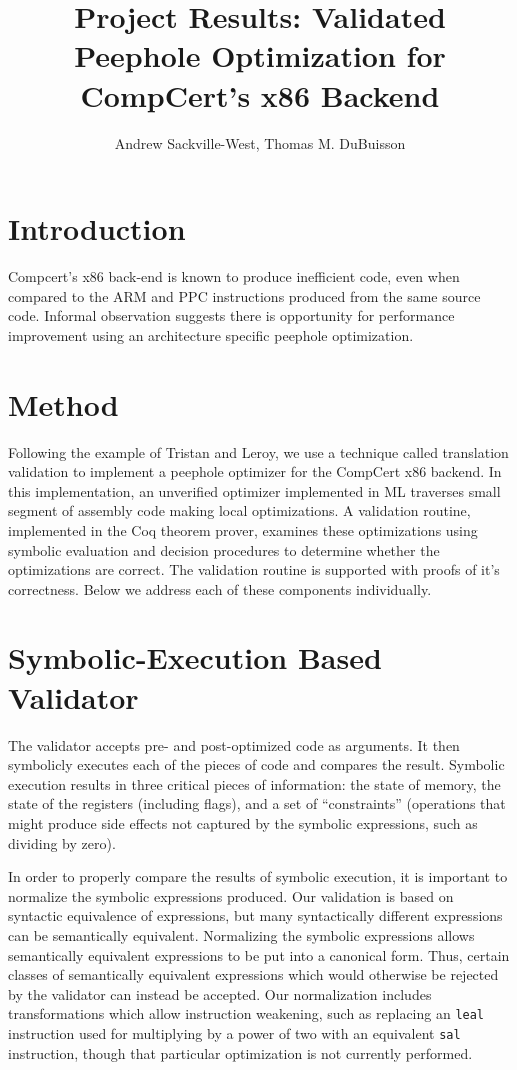 \documentclass{article}
\title{Project Results: Validated Peephole Optimization for CompCert's x86 Backend}
\author{Andrew Sackville-West, Thomas M. DuBuisson}
\begin{document}
\maketitle

\section{Introduction}

Compcert's x86 back-end is known to produce inefficient code, even
when compared to the ARM and PPC instructions produced from the same
source code.  Informal observation suggests there is opportunity for
performance improvement using an architecture specific peephole
optimization.

\section{Method}

Following the example of Tristan and Leroy, we use a technique called
translation validation to implement a peephole optimizer for the
CompCert x86 backend. In this implementation, an unverified optimizer
implemented in ML traverses small segment of assembly code making
local optimizations. A validation routine, implemented in the Coq
theorem prover, examines these optimizations using symbolic evaluation
and decision procedures to determine whether the optimizations are
correct. The validation routine is supported with proofs of it's
correctness.  Below we address each of these components individually.

\section{Symbolic-Execution Based Validator}

The validator accepts pre- and post-optimized code as arguments.
It then symbolicly executes each of the pieces of code and compares
the result.  Symbolic execution results in three critical pieces of
information: the state of memory, the state of the registers
(including flags), and a set of ``constraints'' (operations that might
produce side effects not captured by the symbolic expressions, such as
dividing by zero).

In order to properly compare the results of symbolic execution, it is
important to normalize the symbolic expressions produced. Our
validation is based on syntactic equivalence of expressions, but many
syntactically different expressions can be semantically
equivalent. Normalizing the symbolic expressions allows semantically
equivalent expressions to be put into a canonical form. Thus, certain
classes of semantically equivalent expressions which would otherwise
be rejected by the validator can instead be accepted. Our
normalization includes transformations which allow instruction
weakening, such as replacing an {\tt leal} instruction used for
multiplying by a power of two with an equivalent {\tt sal}
instruction, though that particular optimization is not currently
performed.
\end{document}

